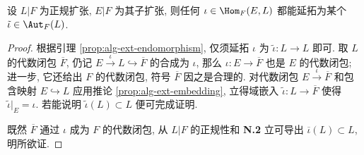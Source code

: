 \begin{proposition}\label{prop:normal-ext-prolongation}
	设 $L|F$ 为正规扩张, $E|F$ 为其子扩张, 则任何 $\iota \in \Hom_F(E, L)$ 都能延拓为某个 $\tilde{\iota} \in \Aut_F(L)$.
\end{proposition}
\begin{proof}
	根据引理 \ref{prop:alg-ext-endomorphism}, 仅须延拓 $\iota$ 为 $\tilde{\iota}: L \to L$ 即可. 取 $L$ 的代数闭包 $\overline{F}$, 仍记 $E \xrightarrow{\iota} L \hookrightarrow \overline{F}$ 的合成为 $\iota$, 那么 $\iota: E \to \overline{F}$ 也是 $E$ 的代数闭包; 进一步, 它还给出 $F$ 的代数闭包, 符号 $\overline{F}$ 因之是合理的. 对代数闭包 $E \xrightarrow{\iota} \overline{F}$ 和包含映射 $E \hookrightarrow L$ 应用推论 \ref{prop:alg-ext-embedding}, 立得域嵌入 $\tilde{\iota}: L \to \overline{F}$ 使得 $\tilde{\iota}|_E = \iota$. 若能说明 $\tilde{\iota}(L) \subset L$ 便可完成证明.

	既然 $\overline{F}$ 通过 $\iota$ 成为 $F$ 的代数闭包, 从 $L|F$ 的正规性和 \textbf{N.2} 立可导出 $\overline{\iota}(L) \subset L$, 明所欲证.
\end{proof}


